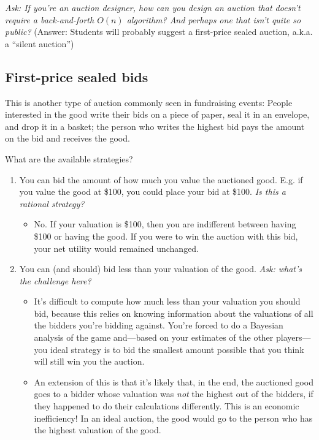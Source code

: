 \documentclass[11pt]{article}
\begin{document}
{\it Ask: If you're an auction designer, how can you design an auction that doesn't require a back-and-forth $O(n)$ algorithm? And perhaps one that isn't quite so public?} (Answer: Students will probably suggest a first-price sealed auction, a.k.a. a ``silent auction'')


\subsection{First-price sealed bids}

This is another type of auction commonly seen in fundraising events: People interested in the good write their bids on a piece of paper, seal it in an envelope, and drop it in a basket; the person who writes the highest bid pays the amount on the bid and receives the good.

What are the available strategies? 
\begin{enumerate}
    \item You can bid the amount of how much you value the auctioned good. E.g. if you value the good at \$100, you could place your bid at \$100. {\it Is this a rational strategy?}
    \begin{itemize}
        \item No. If your valuation is \$100, then you are indifferent between having \$100 or having the good. If you were to win the auction with this bid, your net utility would remained unchanged.
    \end{itemize}
    \item You can (and should) bid less than your valuation of the good. {\it Ask: what's the challenge here?}
    \begin{itemize}
        \item It's difficult to compute how much less than your valuation you should bid, because this relies on knowing information about the valuations of all the bidders you're bidding against. You're forced to do a Bayesian analysis of the game and---based on your estimates of the other players---you ideal strategy is to bid the smallest amount possible that you think will still win you the auction.
        \item An extension of this is that it's likely that, in the end, the auctioned good goes to a bidder whose valuation was {\it not} the highest out of the bidders, if they happened to do their calculations differently. This is an economic inefficiency! In an ideal auction, the good would go to the person who has the highest valuation of the good.
    \end{itemize}
\end{enumerate}
\end{document}
